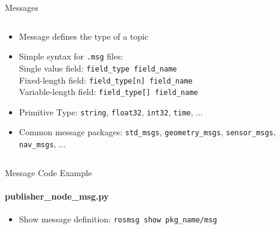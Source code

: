 \documentclass{beamer}
\newcommand{\inline}[1]{\texttt{#1}}
\begin{document}
\begin{frame}{Messages}
	\begin{columns}
		\begin{column}{0.6\textwidth}
			\begin{itemize}
				\item Message defines the type of a topic
				\item Simple syntax for \texttt{.msg} files:\\%
					Single value field: \inline{field_type field_name}\\%
					Fixed-length field: \inline{field_type[n] field_name}\\%
					Variable-length field: \inline{field_type[] field_name}
				\item Primitive Type: \inline{string}, \inline{float32}, \inline{int32}, \inline{time}, ...
				\item Common message packages: \inline{std_msgs}, \inline{geometry_msgs}, \inline{sensor_msgs}, \inline{nav_msgs}, ...
			\end{itemize}
		\end{column}
		\begin{column}{0.4\textwidth}
			\centering
		\end{column}
	\end{columns}
\end{frame}

\begin{frame}{Message Code Example}
\framesubtitle{publisher\_node\_msg.py}
\begin{itemize}
	\item Show message definition: \inline{rosmsg show pkg_name/msg}
\end{itemize}
\end{frame}
\end{document}
